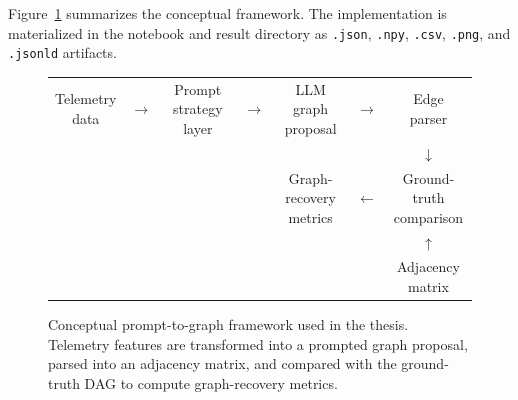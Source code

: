 Figure~\ref{fig:graph-recovery-pipeline} summarizes the conceptual framework.
The implementation is materialized in the notebook and result directory as
\texttt{.json}, \texttt{.npy}, \texttt{.csv}, \texttt{.png}, and
\texttt{.jsonld} artifacts.

\begin{figure}[!htbp]
  \centering
  \begingroup
  \newcommand{\pipelinebox}[1]{%
    \fcolorbox{thesisline}{thesisgray}{%
      \parbox[c][13mm][c]{0.19\textwidth}{\centering\small\bfseries #1}%
    }%
  }
  \setlength{\tabcolsep}{2.5pt}
  \begin{tabular}{@{}ccccccc@{}}
    \pipelinebox{Telemetry\\data} &
    \(\rightarrow\) &
    \pipelinebox{Prompt strategy\\layer} &
    \(\rightarrow\) &
    \pipelinebox{LLM graph\\proposal} &
    \(\rightarrow\) &
    \pipelinebox{Edge\\parser} \\
    &&&&&& \(\downarrow\) \\
    \multicolumn{3}{c}{} &&
    \pipelinebox{Graph-recovery\\metrics} &
    \(\leftarrow\) &
    \pipelinebox{Ground-truth\\comparison} \\
    &&&&&& \(\uparrow\) \\
    \multicolumn{5}{c}{} &&
    \pipelinebox{Adjacency\\matrix}
  \end{tabular}
  \endgroup
  \caption{Conceptual prompt-to-graph framework used in the thesis. Telemetry features are transformed into a prompted graph proposal, parsed into an adjacency matrix, and compared with the ground-truth DAG to compute graph-recovery metrics.}
  \label{fig:graph-recovery-pipeline}
\end{figure}

